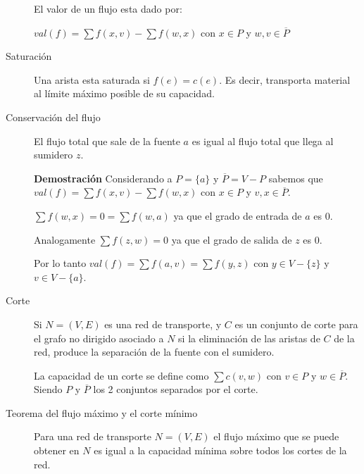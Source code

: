 \begin{description}
	El valor de un flujo esta dado por:
	
	$val(f) = \sum f(x,v) - \sum f(w,x)$ con $x \in P$ y $w,v \in \overline{P}$
	
	\item[Saturación] Una arista esta saturada si $f(e) = c(e)$.
	Es decir, transporta material al límite máximo posible de su capacidad.
	
	\item[Conservación del flujo] El flujo total que sale de la fuente $a$ es igual al flujo total que llega al sumidero $z$.
	
	\textbf{Demostración} Considerando a $P = \{a\}$ y $\overline{P} = V - P$ sabemos que $val(f) = \sum f(x,v) - \sum f(w,x)$ con $x \in P$ y $v,x \in \overline{P}$.
	
	$ \sum f(w,x) = 0 = \sum f(w,a)$ ya que el grado de entrada de $a$ es 0.
	
	Analogamente $ \sum f(z,w) = 0$ ya que el grado de salida de $z$ es 0.
	
	Por lo tanto $val(f) = \sum f(a,v) = \sum f(y,z)$ con $y \in V - \{z\}$ y $v \in V - \{a\}$. 
	
	\item[Corte] Si $N = (V,E)$ es una red de transporte, y $C$ es un conjunto de corte para el grafo no dirigido asociado a $N$ si la eliminación de las aristas de $C$ de la red, produce la separación de la fuente con el sumidero.
	
	La capacidad de un corte se define como $\sum c(v,w)$ con $v \in P$ y $w \in \overline{P}$.
	Siendo $P$ y $\overline{P}$ los 2 conjuntos separados por el corte.
	
	\item[Teorema del flujo máximo y el corte mínimo] Para una red de transporte $N = (V,E)$ el flujo máximo que se puede obtener en $N$ es igual a la capacidad mínima sobre todos los cortes de la red.
\end{description}
